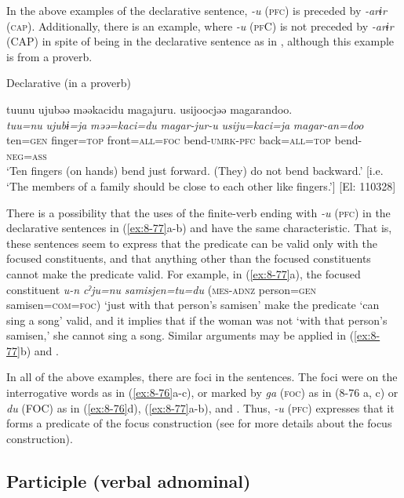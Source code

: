 In the above examples of the declarative sentence, \textit{-u} (\textsc{pfc}) is preceded by \textit{-arɨr} (\textsc{cap}). Additionally, there is an example, where \textit{-u} (\textsc{pf}C) is not preceded by \textit{-arɨr} (CAP) in spite of being in the declarative sentence as in , although this example is from a proverb.

\ea\label{ex:8-78}
  Declarative (in a proverb)

  {\TM}
\glll  tuunu  ujubəə  məəkacidu  magajuru.   usijoocjəə  magarandoo.\\
\textit{tuu=nu}  \textit{ujubɨ=ja}  \textit{məə=kaci=du}  \textit{magar-jur-u}   \textit{usiju=kaci=ja}  \textit{magar-an=doo}\\
    ten=\textsc{gen}  finger=\textsc{top}  front=\textsc{all}=\textsc{foc}  bend-\textsc{umrk}-\textsc{pfc}  back=\textsc{all}=\textsc{top}  bend-\textsc{neg}=\textsc{ass}\\
\glt ‘Ten fingers (on hands) bend just forward. (They) do not bend backward.’ [i.e. ‘The members of a family should be close to each other like fingers.’]   [El: 110328]
\z

There is a possibility that the uses of the finite-verb ending with \textit{-u} (\textsc{pfc}) in the declarative sentences in (\ref{ex:8-77}a-b) and  have the same characteristic. That is, these sentences seem to express that the predicate can be valid only with the focused constituents, and that anything other than the focused constituents cannot make the predicate valid. For example, in (\ref{ex:8-77}a), the focused constituent \textit{u-n} \textit{cˀju=nu} \textit{samisjen=tu=du} (\textsc{mes}-\textsc{adnz} person=\textsc{gen} samisen=\textsc{com}=\textsc{foc}) ‘just with that person’s samisen’ make the predicate ‘can sing a song’ valid, and it implies that if the woman was not ‘with that person’s samisen,’ she cannot sing a song. Similar arguments may be applied in (\ref{ex:8-77}b) and .

  In all of the above examples, there are foci in the sentences. The foci were on the interrogative words as in (\ref{ex:8-76}a-c), or marked by \textit{ga} (\textsc{foc}) as in (8-76 a, c) or \textit{du} (FOC) as in (\ref{ex:8-76}d), (\ref{ex:8-77}a-b), and . Thus, \textit{-u} (\textsc{pfc}) expresses that it forms a predicate of the focus construction (see  for more details about the focus construction).

\subsection{Participle (verbal adnominal)}

